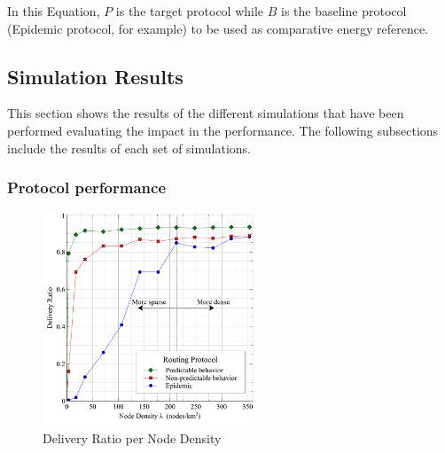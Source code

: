 \documentclass[conference]{IEEEtran}
\begin{document}

In this Equation, $P$ is the target protocol while $B$ is the baseline protocol (Epidemic protocol, for example) to be used as comparative energy reference.




\subsection{Simulation Results}


This section shows the results of the different simulations that have been performed evaluating the impact in the performance.
The following subsections include the results of each set of simulations.

\subsubsection{Protocol performance}

\begin{figure}[!t]
	\centering
	\includegraphics[width=2.5in]{Graphs/DeliveryRatio.pdf}
	\caption{Delivery Ratio per Node Density}
	\label{Delivery Ratio per Node Density}
\end{figure}
\end{document}
